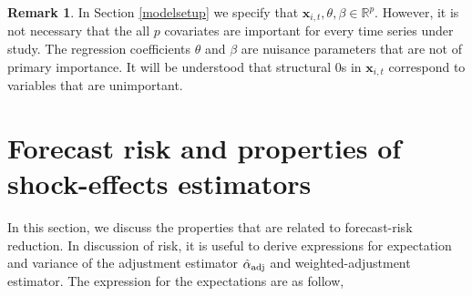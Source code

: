 \documentclass[11pt]{article}
\def\mbf#1{\mathbf{#1}} %
\newcommand{\reals}{\mathbb{R}} %
\theoremstyle{definition}
\newtheorem{remark}{Remark}
\begin{document}
\begin{remark}
In Section \ref{modelsetup} we specify that $\mbf{x}_{i,t}, \theta, \beta \in \reals^p$. 
However, it is not necessary that the all $p$ covariates are important for every time series under study. The regression coefficients $\theta$ and $\beta$ are nuisance parameters that are not of primary importance. 
It will be understood that structural 0s in $\mbf{x}_{i,t}$ correspond to variables that are unimportant. 
\end{remark}



\section{Forecast risk and properties of shock-effects estimators}
\label{properties}

In this section, we discuss the properties that are related to forecast-risk reduction. In discussion of risk, it is useful to derive expressions for expectation and variance of the adjustment estimator $\hat{\alpha}_{\rm adj}$ and weighted-adjustment estimator.  The expression for the expectations are as follow,
\end{document}
